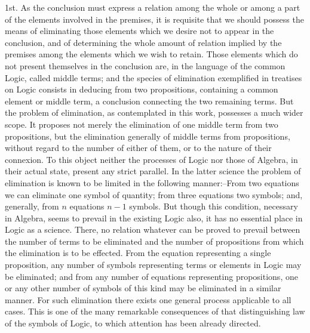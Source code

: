 \documentclass[oneside]{book}
\begin{document}
1st. As the conclusion must express a relation among the
whole or among a part of the elements involved in the premises,
it is requisite that we should possess the means of eliminating
those elements which we desire not to appear in the conclusion,
and of determining the whole amount of relation implied by the
premises among the elements which we wish to retain. Those
elements which do not present themselves in the conclusion are,
in the language of the common Logic, called middle terms; and
the species of elimination exemplified in treatises on Logic consists
in deducing from two propositions, containing a common element
or middle term, a conclusion connecting the two remaining terms.
But the problem of elimination, as contemplated in this work,
possesses a much wider scope. It proposes not merely the elimination
of one middle term from two propositions, but the elimination
generally of middle terms from propositions, without
regard to the number of either of them, or to the nature of their
connexion. To this object neither the processes of Logic nor
those of Algebra, in their actual state, present any strict parallel.
In the latter science the problem of elimination is known to be
limited in the following manner:--From two equations we can
eliminate one symbol of quantity; from three equations two
symbols; and, generally, from $n$ equations $n-1$ symbols. But
though this condition, necessary in Algebra, seems to prevail in
the existing Logic also, it has no essential place in Logic as a
science. There, no relation whatever can be proved to prevail
between the number of terms to be eliminated and the number
of propositions from which the elimination is to be effected.
From the equation representing a single proposition, any number
of symbols representing terms or elements in Logic may be
eliminated; and from any number of equations representing propositions,
one or any other number of symbols of this kind may
be eliminated in a similar manner. For such elimination there
exists one general process applicable to all cases. This is one of
the many remarkable consequences of that distinguishing law of
the symbols of Logic, to which attention has been already
directed.
\end{document}
